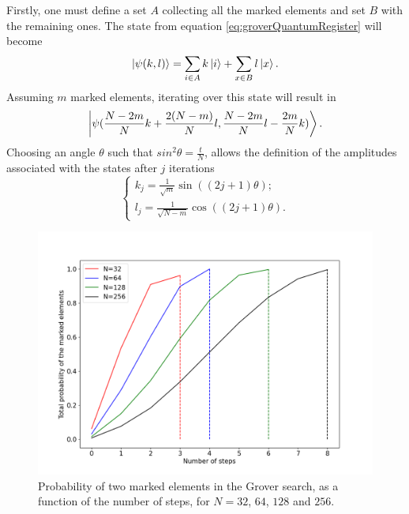 \documentclass[../../dissertation.tex]{subfiles}
\begin{document}
Firstly, one must define a set $A$ collecting all the marked elements
and set $B$ with the remaining ones. The state from equation
\eqref{eq:groverQuantumRegister} will become
\begin{equation}
	\ket{\psi(k,l)} =\sum_{i\in A} k\ket{i} + \sum_{x \in B}l\ket{x}.
\end{equation}
Assuming $m$ marked elements, iterating over this state will result in
\begin{equation}
	\ket{\psi(\frac{N-2m}{N}k + \frac{2(N-m)}{N}l, \frac{N-2m}{N}l - \frac{2m}{N}k)}.
\end{equation}
Choosing an angle $\theta$ such that $sin^2\theta=\frac{t}{N}$, allows the
definition of the amplitudes associated with the states after $j$ iterations 
\begin{equation}
	\begin{cases}
		k_{j} =\frac{1}{\sqrt{m}} \sin{((2j+1)\theta)};
		\\l_{j} = \frac{1}{\sqrt{N-m}}\cos{((2j+1)\theta)}.
	\end{cases}\label{eq:groverKandJ2}
\end{equation}
\begin{figure}[h]
	\centering
	\includegraphics[scale=0.40]{img/Grover/GroverMultipleMarked3264128256}
	\caption{Probability of two marked elements in the Grover search, as a function of the number of steps, for $N=32$, $64$, $128$ and $256$.} 
	\label{fig:groverMultipleMarked3264128256}
\end{figure}
\end{document}

